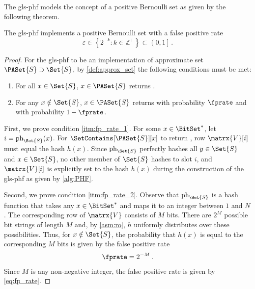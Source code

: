 \documentclass[ ../main.tex]{subfiles}
\begin{document}
The \gls{gls-phf} models the concept of a positive Bernoulli set
as given by the following theorem.
\begin{theorem}
\label{thm:fp_rate}
The \gls{gls-phf} implements a positive Bernoulli set with a false positive rate
\begin{equation}
\label{eq:fp_rate}
    \varepsilon \in \left\{ 2^{-k} \colon k \in \mathbb{Z}^+\right\} \subset \left(0, 1\right]\,.
\end{equation}
\end{theorem}
\begin{proof}
For the \gls{gls-phf} to be an implementation of approximate set $\PASet{S} \supset \Set{S}$, by \cref{def:approx_set} the following conditions must be met:
\begin{enumerate}
\item\label{itm:fp_rate_1} For all $x \in \Set{S}$, $x \in \PASet{S}$ returns \True.
\item\label{itm:fp_rate_2} For any $x \notin \Set{S}$, $x \in \PASet{S}$ returns \True with probability $\fprate$ and \False with probability $1 - \fprate$.
\end{enumerate}

First, we prove condition \ref{itm:fp_rate_1}. For some $x \in \BitSet^*$,
let $i = \ph_{\Set{S}}(x)$. For $\SetContains[\PASet{S}][x]$ to return \True, row $\matrx{V}[i]$ must equal the hash $h(x)$. Since $\ph_{\Set{S}}$ perfectly hashes all $y \in \Set{S}$ and $x \in \Set{S}$, no other member of $\Set{S}$ hashes to slot $i$, and $\matrx{V}[i]$ is explicitly set to the hash $h(x)$ during the construction of the \gls{gls-phf} as given by \cref{alg:PHF}.

Second, we prove condition \ref{itm:fp_rate_2}. Observe that $\ph_{\Set{S}}$ is a hash function that takes any $x \in \BitSet^*$ and maps it to an integer between $1$ and $N$. The corresponding row of $\matrx{V}$ consists of $M$ bits. There are $2^M$ possible bit strings of length $M$ and, by \cref{asm:ro}, $h$ uniformly distributes over these possibilities. Thus, for $x \notin \Set{S}$, the probability that $h(x)$ is equal to the corresponding $M$ bits is given by the false positive rate
\begin{equation}
\fprate = 2^{-M}\,.
\end{equation}
Since $M$ is any non-negative integer, the false positive rate is given by \cref{eq:fp_rate}.
\end{proof}
\end{document}
